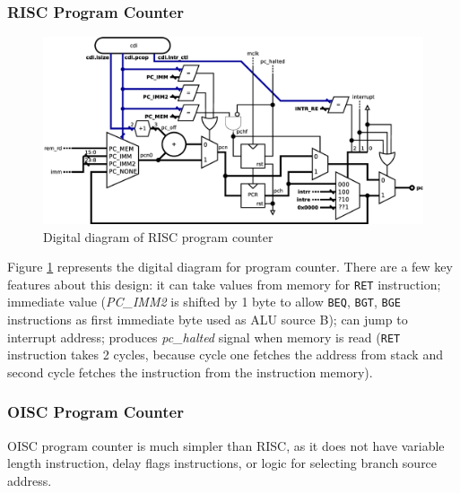 \subsubsection{RISC Program Counter}

\begin{figure}[h!]
	\centering
	\includegraphics[width=\linewidth]{../resources/risc_pc.eps}
	\caption{Digital diagram of RISC program counter}
	\label{fig:risc_pc}
\end{figure}

Figure \ref{fig:risc_pc} represents the digital diagram for program counter. There are a few key features about this design: it can take values from memory for \texttt{RET} instruction; immediate value (\textit{PC\_IMM2} is shifted by 1 byte to allow \texttt{BEQ}, \texttt{BGT}, \texttt{BGE} instructions as first immediate byte used as ALU source B); can jump to interrupt address; produces \textit{pc\_halted} signal when memory is read (\texttt{RET} instruction takes 2 cycles, because cycle one fetches the address from stack and second cycle fetches the instruction from the instruction memory).

\subsubsection{OISC Program Counter}\label{subsec:oisc_pc}
 
 OISC program counter is much simpler than RISC, as it does not have variable length instruction, delay flags instructions, or logic for selecting branch source address. 
 
